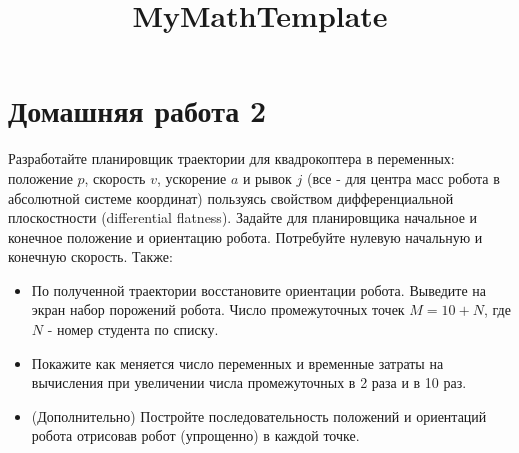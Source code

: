 \documentclass[8pt]{article}
\title{MyMathTemplate}
\begin{document}
\section*{Домашняя работа 2 }

Разработайте планировщик траектории для квадрокоптера в переменных: положение $p$, скорость $v$, ускорение $a$ и рывок $j$ (все - для центра масс робота в абсолютной системе координат) пользуясь свойством дифференциальной плоскостности (differential flatness). Задайте для планировщика начальное и конечное положение и ориентацию робота. Потребуйте нулевую начальную и конечную скорость. Также:

\begin{itemize}
    \item По полученной траектории восстановите ориентации робота. Выведите на экран набор порожений робота. Число промежуточных точек $M = 10+N$, где $N$ - номер студента по списку.

    \item Покажите как меняется число переменных и временные затраты на вычисления при увеличении числа промежуточных в 2 раза и в 10 раз.
    
    \item  (Дополнительно) Постройте последовательность положений и ориентаций робота отрисовав робот (упрощенно) в каждой точке.

\end{itemize}
\end{document}
